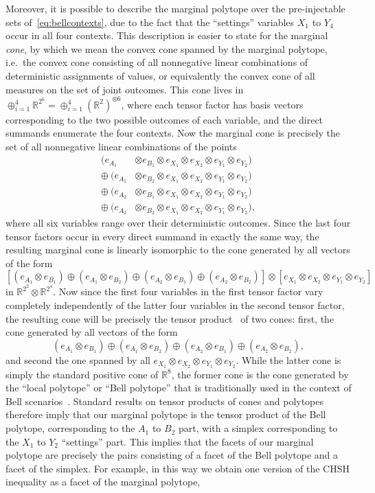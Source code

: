 {Moreover, it is possible to describe the marginal polytope over the pre-injectable sets of~\cref{eq:bellcontexts}, due to the fact that the ``settings'' variables $X_1$ to $Y_4$ occur in all four contexts. This description is easier to state for the marginal \emph{cone}, by which we mean the convex cone spanned by the marginal polytope, i.e.~the convex cone consisting of all nonnegative linear combinations of deterministic assignments of values, or equivalently the convex cone of all measures on the set of joint outcomes. This cone lives in $\oplus_{i=1}^4 \mathbb{R}^{2^6} = \oplus_{i=1}^4 (\mathbb{R}^2)^{\otimes 6}$, where each tensor factor has basis vectors corresponding to the two possible outcomes of each variable, and the direct summands enumerate the four contexts. Now the marginal cone is precisely the set of all nonnegative linear combinations of the points
\begin{align*}
	(e_{A_1} & \otimes e_{B_1} \otimes e_{X_1} \otimes e_{X_2} \otimes e_{Y_1} \otimes e_{Y_2}) \\
	\oplus\: (e_{A_1} & \otimes e_{B_2} \otimes e_{X_1} \otimes e_{X_2} \otimes e_{Y_1} \otimes e_{Y_2}) \\
	\oplus\: (e_{A_2} & \otimes e_{B_1} \otimes e_{X_1} \otimes e_{X_2} \otimes e_{Y_1} \otimes e_{Y_2}) \\
	\oplus\: (e_{A_2} & \otimes e_{B_2} \otimes e_{X_1} \otimes e_{X_2} \otimes e_{Y_1} \otimes e_{Y_2}),
\end{align*}
where all six variables range over their deterministic outcomes. Since the last four tensor factors occur in every direct summand in exactly the same way, the resulting marginal cone is linearly isomorphic to the cone generated by all vectors of the form
\[
	\left[ (e_{A_1} \otimes e_{B_1}) \oplus (e_{A_1} \otimes e_{B_2}) \oplus (e_{A_2} \otimes e_{B_1}) \oplus (e_{A_2} \otimes e_{B_2})\right] \otimes \left[ e_{X_1} \otimes e_{X_2} \otimes e_{Y_1} \otimes e_{Y_2}\right]
\]
in $\mathbb{R}^{2^2}\otimes \mathbb{R}^{2^4}$. Now since the first four variables in the first tensor factor vary completely independently of the latter four variables in the second tensor factor, the resulting cone will be precisely the tensor product~\cite{namioka_tensor_1969} of two cones: first, the cone generated by all vectors of the form
\[
	(e_{A_1} \otimes e_{B_1}) \oplus (e_{A_1} \otimes e_{B_2}) \oplus (e_{A_2} \otimes e_{B_1}) \oplus (e_{A_2} \otimes e_{B_2}),
\]
and second the one spanned by all $e_{X_1} \otimes e_{X_2} \otimes e_{Y_1} \otimes e_{Y_2}$. While the latter cone is simply the standard positive cone of $\mathbb{R}^8$, the former cone is the cone generated by the ``local polytope'' or ``Bell polytope'' that is traditionally used in the context of Bell scenarios~\cite[Sec.~II.B]{Brunner2013Bell}. Standard results on tensor products of cones and polytopes~\cite{bogart_hom_2013} therefore imply that our marginal polytope is the tensor product of the Bell polytope, corresponding to the $A_1$ to $B_2$ part, with a simplex corresponding to the $X_1$ to $Y_2$ ``settings'' part. This implies that the facets of our marginal polytope are precisely the pairs consisting of a facet of the Bell polytope and a facet of the simplex. For example, in this way we obtain one version of the CHSH inequality as a facet of the marginal polytope,
}
